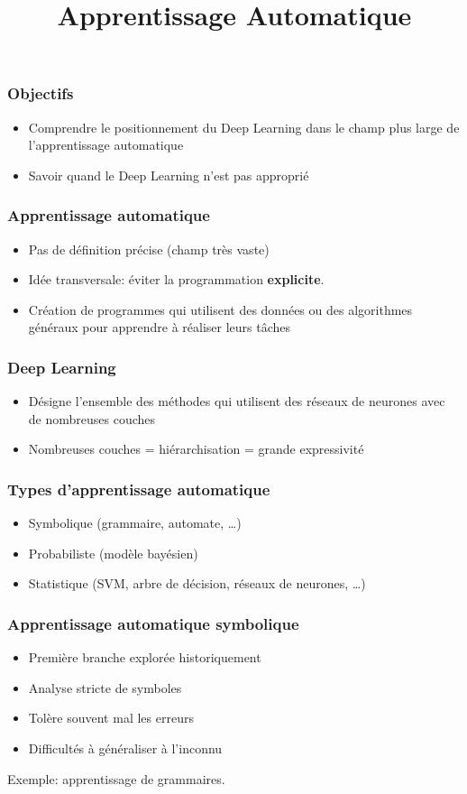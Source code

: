 \documentclass{formation}
\title{Apprentissage Automatique}
\begin{document}
\maketitle

\begin{frame}
  \frametitle{Objectifs}
  \begin{itemize}
  \item Comprendre le positionnement du Deep Learning dans le champ
    plus large de l'apprentissage automatique
  \item Savoir quand le Deep Learning n'est pas approprié
  \end{itemize}
\end{frame}

\begin{frame}
  \frametitle{Apprentissage automatique}
  \begin{itemize}
  \item Pas de définition précise (champ très vaste)
  \item Idée transversale: éviter la programmation \textbf{explicite}.
  \item Création de programmes qui utilisent des données ou des
    algorithmes généraux pour apprendre à réaliser leurs tâches
  \end{itemize}
\end{frame}

\begin{frame}
  \frametitle{Deep Learning}
  \begin{itemize}
  \item Désigne l'ensemble des méthodes qui utilisent des réseaux de
    neurones avec de nombreuses couches
  \item Nombreuses couches = hiérarchisation = grande expressivité
  \end{itemize}
\end{frame}

\begin{frame}
  \frametitle{Types d'apprentissage automatique}
  \begin{itemize}
  \item Symbolique (grammaire, automate, …)
  \item Probabiliste (modèle bayésien)
  \item Statistique (SVM, arbre de décision, réseaux de neurones, …)
  \end{itemize}
\end{frame}

\begin{frame}
  \frametitle{Apprentissage automatique symbolique}
  \begin{itemize}
  \item Première branche explorée historiquement
  \item Analyse stricte de symboles
  \item Tolère souvent mal les erreurs
  \item Difficultés à généraliser à l'inconnu
  \end{itemize}
  Exemple: apprentissage de grammaires.
\end{frame}
\end{document}
